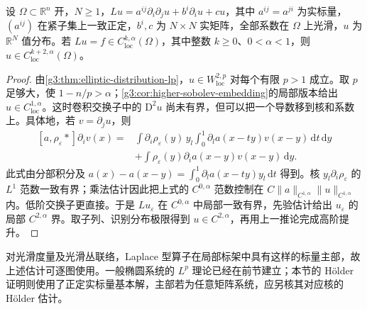 \begin{corollary}\label{g3:cor:schauder-distribution-smooth-coefficients}
	设 \(\Omega\subset\mathbb R^n\) 开，\(N\ge1\)，\(Lu=a^{ij}\partial_i\partial_ju+b^i\partial_i u+cu\)，其中 \(a^{ij}=a^{ji}\) 为实标量，\((a^{ij})\) 在紧子集上一致正定，\(b^i,c\) 为 \(N\times N\) 实矩阵，全部系数在 \(\Omega\) 上光滑，\(u\) 为 \(\mathbb R^N\) 值分布。若 \(Lu=f\in C^{k,\alpha}_{\mathrm{loc}}(\Omega)\)，其中整数 \(k\ge0\)、\(0<\alpha<1\)，则 \(u\in C^{k+2,\alpha}_{\mathrm{loc}}(\Omega)\)。
\end{corollary}
\begin{proof}
	由\cref{g3:thm:elliptic-distribution-lp}，\(u\in W^{2,p}_{\mathrm{loc}}\) 对每个有限 \(p>1\) 成立。取 \(p\) 足够大，使 \(1-n/p>\alpha\)；\cref{g3:cor:higher-sobolev-embedding}的局部版本给出 \(u\in C^{1,\alpha}_{\mathrm{loc}}\)。这时卷积交换子中的 \(\mathrm D^2u\) 尚未有界，但可以把一个导数移到核和系数上。具体地，若 \(v=\partial_ju\)，则
	\[
	\begin{aligned}
		[a,\rho_\varepsilon*]\partial_i v(x)
		={}&\int\partial_i\rho_\varepsilon(y)\,y_l
		\int_0^1\partial_la(x-ty)v(x-y)\,\mathrm dt\,\mathrm dy\\
		&+\int\rho_\varepsilon(y)\partial_i a(x-y)v(x-y)\,\mathrm dy.
	\end{aligned}
	\]
	此式由分部积分及 \(a(x)-a(x-y)=\int_0^1\partial_la(x-ty)y_l\,\mathrm dt\) 得到。核 \(y_l\partial_i\rho_\varepsilon\) 的 \(L^1\) 范数一致有界；乘法估计因此把上式的 \(C^{0,\alpha}\) 范数控制在 \(C\|a\|_{C^{1,\alpha}}\|u\|_{C^{1,\alpha}}\) 内。低阶交换子更直接。于是 \(Lu_\varepsilon\) 在 \(C^{0,\alpha}\) 中局部一致有界，先验估计给出 \(u_\varepsilon\) 的局部 \(C^{2,\alpha}\) 界。取子列、识别分布极限得到 \(u\in C^{2,\alpha}\)，再用上一推论完成高阶提升。
\end{proof}

对光滑度量及光滑丛联络，Laplace 型算子在局部标架中具有这样的标量主部，故上述估计可逐图使用。一般椭圆系统的 \(L^p\) 理论已经在前节建立；本节的 Hölder 证明则使用了正定实标量基本解，主部若为任意矩阵系统，应另核其对应核的 Hölder 估计。
